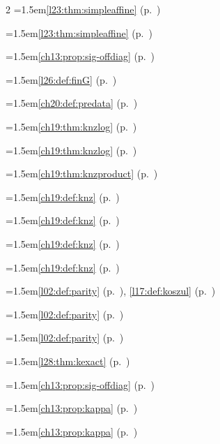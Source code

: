 \begin{multicols}{2}
\hangindent=1.5em\quad \ref{l23:thm:simpleaffine} (p.~\pageref{l23:thm:simpleaffine})\par
\hangindent=1.5em\quad \ref{l23:thm:simpleaffine} (p.~\pageref{l23:thm:simpleaffine})\par
\hangindent=1.5em\quad \ref{ch13:prop:sig-offdiag} (p.~\pageref{ch13:prop:sig-offdiag})\par
\hangindent=1.5em\quad \ref{l26:def:finG} (p.~\pageref{l26:def:finG})\par
\hangindent=1.5em\quad \ref{ch20:def:predata} (p.~\pageref{ch20:def:predata})\par
\hangindent=1.5em\quad \ref{ch19:thm:knzlog} (p.~\pageref{ch19:thm:knzlog})\par
\hangindent=1.5em\quad \ref{ch19:thm:knzlog} (p.~\pageref{ch19:thm:knzlog})\par
\hangindent=1.5em\quad \ref{ch19:thm:knzproduct} (p.~\pageref{ch19:thm:knzproduct})\par
\hangindent=1.5em\quad \ref{ch19:def:knz} (p.~\pageref{ch19:def:knz})\par
\hangindent=1.5em\quad \ref{ch19:def:knz} (p.~\pageref{ch19:def:knz})\par
\hangindent=1.5em\quad \ref{ch19:def:knz} (p.~\pageref{ch19:def:knz})\par
\hangindent=1.5em\quad \ref{ch19:def:knz} (p.~\pageref{ch19:def:knz})\par
\hangindent=1.5em\quad \ref{l02:def:parity} (p.~\pageref{l02:def:parity}), \ref{l17:def:koszul} (p.~\pageref{l17:def:koszul})\par
\hangindent=1.5em\quad \ref{l02:def:parity} (p.~\pageref{l02:def:parity})\par
\hangindent=1.5em\quad \ref{l02:def:parity} (p.~\pageref{l02:def:parity})\par
\hangindent=1.5em\quad \ref{l28:thm:kexact} (p.~\pageref{l28:thm:kexact})\par
\hangindent=1.5em\quad \ref{ch13:prop:sig-offdiag} (p.~\pageref{ch13:prop:sig-offdiag})\par
\hangindent=1.5em\quad \ref{ch13:prop:kappa} (p.~\pageref{ch13:prop:kappa})\par
\hangindent=1.5em\quad \ref{ch13:prop:kappa} (p.~\pageref{ch13:prop:kappa})\par

\end{multicols}

